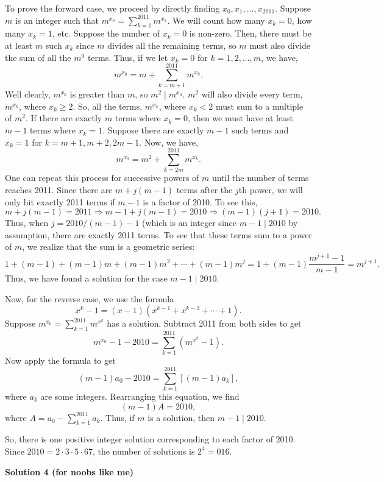\begin{enumerate}
 To prove the forward case, we proceed by directly finding $x_0,x_1,\ldots,x_{2011}$. Suppose $m$ is an integer such that $m^{x_0} = \sum_{k=1}^{2011}m^{x_k}$. We will count how many $x_k = 0$, how many $x_k = 1$, etc. Suppose the number of $x_k = 0$ is non-zero. Then, there must be at least $m$ such $x_k$ since $m$ divides all the remaining terms, so $m$ must also divide the sum of all the $m^0$ terms. Thus, if we let $x_k = 0$ for $k = 1,2,\ldots,m$, we have,
 \[m^{x_0} = m + \sum_{k=m+1}^{2011}m^{x_k}.\]Well clearly, $m^{x_0}$ is greater than $m$, so $m^2 \mid m^{x_0}$. $m^2$ will also divide every term, $m^{x_k}$, where $x_k \geq 2$. So, all the terms, $m^{x_k}$, where $x_k < 2$ must sum to a multiple of $m^2$. If there are exactly $m$ terms where $x_k = 0$, then we must have at least $m-1$ terms where $x_k = 1$. Suppose there are exactly $m-1$ such terms and $x_k = 1$ for $k = m+1,m+2,2m-1$. Now, we have,
 \[m^{x_0} = m^2 + \sum_{k=2m}^{2011}m^{x_k}.\]One can repeat this process for successive powers of $m$ until the number of terms reaches 2011. Since there are $m + j(m-1)$ terms after the $j$th power, we will only hit exactly 2011 terms if $m-1$ is a factor of 2010. To see this, 
 \[m+j(m-1) = 2011 \Rightarrow m-1+j(m-1) = 2010 \Rightarrow (m-1)(j+1) = 2010.\]Thus, when $j = 2010/(m-1) - 1$ (which is an integer since $m-1 \mid 2010$ by assumption, there are exactly 2011 terms. To see that these terms sum to a power of $m$, we realize that the sum is a geometric series:
 \[1 + (m-1) + (m-1)m+(m-1)m^2 + \cdots + (m-1)m^j = 1+(m-1)\frac{m^{j+1}-1}{m-1} = m^{j+1}.\]Thus, we have found a solution for the case $m-1 \mid 2010$.

 Now, for the reverse case, we use the formula 
 \[x^k-1 = (x-1)(x^{k-1}+x^{k-2}+\cdots+1).\] Suppose $m^{x_0} = \sum_{k=1}^{2011}m^{x^k}$ has a solution. Subtract 2011 from both sides to get 
 \[m^{x_0}-1-2010 = \sum_{k=1}^{2011}(m^{x^k}-1).\] Now apply the formula to get 
 \[(m-1)a_0-2010 = \sum_{k=1}^{2011}[(m-1)a_k],\] where $a_k$ are some integers. Rearranging this equation, we find 
 \[(m-1)A = 2010,\] where $A = a_0 - \sum_{k=1}^{2011}a_k$. Thus, if $m$ is a solution, then $m-1 \mid 2010$. 

 So, there is one positive integer solution corresponding to each factor of 2010. Since $2010 = 2\cdot 3\cdot 5\cdot 67$, the number of solutions is $2^4 = \boxed{016}$.

 



\textbf{Solution 4 (for noobs like me)}


\end{enumerate}
